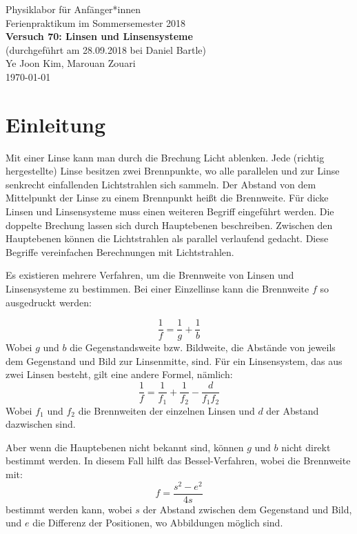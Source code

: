 \documentclass[11pt,a4paper]{article}
\begin{document}
	

{
	\centering 
	\large 
	Physiklabor für Anfänger*innen \\
	Ferienpraktikum im Sommersemester 2018 \\[4mm]
	\textbf{\LARGE 
		Versuch 70: Linsen und Linsensysteme
	} \\[3mm]
	(durchgeführt am 28.09.2018 bei Daniel Bartle) \\
	Ye Joon Kim, Marouan Zouari\\
	\today \\[10mm]
}
\tableofcontents

\section{Einleitung}
Mit einer Linse kann man durch die Brechung Licht ablenken. Jede (richtig hergestellte) Linse besitzen zwei Brennpunkte, wo alle parallelen und zur Linse senkrecht einfallenden Lichtstrahlen sich sammeln. Der Abstand von dem Mittelpunkt der Linse zu einem Brennpunkt heißt die Brennweite. Für dicke Linsen und Linsensysteme muss einen weiteren Begriff eingeführt werden. Die doppelte Brechung lassen sich durch Hauptebenen beschreiben. Zwischen den Hauptebenen können die Lichtstrahlen als parallel verlaufend gedacht. Diese Begriffe vereinfachen Berechnungen mit Lichtstrahlen. 

Es existieren mehrere Verfahren, um die Brennweite von Linsen und Linsensysteme zu bestimmen. Bei einer Einzellinse kann die Brennweite $f$ so ausgedruckt werden: 

\begin{equation}
\frac{1}{f} = \frac{1}{g} + \frac{1}{b}
\end{equation}
Wobei $g$ und $b$ die Gegenstandsweite bzw. Bildweite, die Abstände von jeweils dem Gegenstand und Bild zur Linsenmitte, sind.
Für ein Linsensystem, das aus zwei Linsen besteht, gilt eine andere Formel, nämlich:
\begin{equation}
\frac{1}{f} = \frac{1}{f_1}+\frac{1}{f_2}-\frac{d}{f_1f_2}
\end{equation}
Wobei $f_1$ und $f_2$ die Brennweiten der einzelnen Linsen und $d$ der Abstand dazwischen sind. 

Aber wenn die Hauptebenen nicht bekannt sind, können $g$ und $b$ nicht direkt bestimmt werden. In diesem Fall hilft das Bessel-Verfahren, wobei die Brennweite mit:
\begin{equation}
f = \frac{s^2-e^2}{4s}
\end{equation}
bestimmt werden kann, wobei $s$ der Abstand zwischen dem Gegenstand und Bild, und $e$ die Differenz der Positionen, wo Abbildungen möglich sind. 
\end{document}
